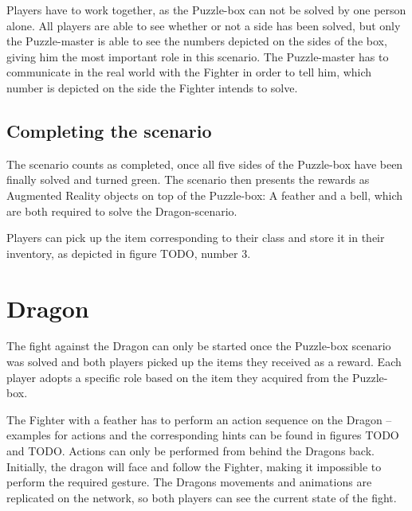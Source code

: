 \documentclass{sigchi-ext}
\begin{document}
Players have to work together, as the Puzzle-box can not be solved by one person alone. All players are able to see whether or not a side has been solved, but only the Puzzle-master is able to see the numbers depicted on the sides of the box, giving him the most important role in this scenario. The Puzzle-master has to communicate in the real world with the Fighter in order to tell him, which number is depicted on the side the Fighter intends to solve.

\subsection{Completing the scenario}

The scenario counts as completed, once all five sides of the Puzzle-box have been finally solved and turned green. The scenario then presents the rewards as Augmented Reality objects on top of the Puzzle-box: A feather and a bell, which are both required to solve the Dragon-scenario.

Players can pick up the item corresponding to their class and store it in their inventory, as depicted in figure TODO, number 3.



\section{Dragon}

The fight against the Dragon can only be started once the Puzzle-box scenario was solved and both players picked up the items they received as a reward. Each player adopts a specific role based on the item they acquired from the Puzzle-box. 

The Fighter with a feather has to perform an action sequence on the Dragon -- examples for actions and the corresponding hints can be found in figures TODO and TODO. Actions can only be performed from behind the Dragons back. Initially, the dragon will face and follow the Fighter, making it impossible to perform the required gesture. The Dragons movements and animations are replicated on the network, so both players can see the current state of the fight.
\end{document}
